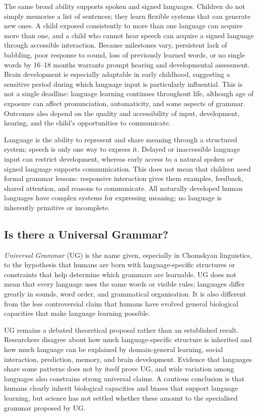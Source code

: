 \documentclass[11pt,oneside]{report}
\begin{document}
The same broad ability supports spoken and signed languages. Children do not
simply memorise a list of sentences; they learn flexible systems that can
generate new ones. A child exposed consistently to more than one language can
acquire more than one, and a child who cannot hear speech can acquire a signed
language through accessible interaction. Because milestones vary, persistent
lack of babbling, poor response to sound, loss of previously learned words, or
no single words by 16--18 months warrants prompt hearing and developmental
assessment. Brain development is especially
adaptable in early childhood, suggesting a sensitive period during which
language input is particularly influential. This is not a single deadline:
language learning continues throughout life, although age of exposure can
affect pronunciation, automaticity, and some aspects of grammar. Outcomes also
depend on the quality and accessibility of input, development, hearing, and the
child's opportunities to communicate.

Language is the ability to represent and share meaning through a structured
system; speech is only one way to express it. Delayed or inaccessible language
input can restrict development, whereas early access to a natural spoken or
signed language supports communication. This does not mean that children need
formal grammar lessons: responsive interaction gives them examples, feedback,
shared attention, and reasons to communicate. All naturally developed human
languages have complex systems for expressing meaning; no language is inherently
primitive or incomplete.

\subsection*{Is there a Universal Grammar?}

\emph{Universal Grammar} (UG) is the name given, especially in Chomskyan
linguistics, to the hypothesis that humans are born with language-specific
structures or constraints that help determine which grammars are learnable. UG
does not mean that every language uses the same words or visible rules;
languages differ greatly in sounds, word order, and grammatical organisation.
It is also different from the less controversial claim that humans have evolved
general biological capacities that make language learning possible.

UG remains a debated theoretical proposal rather than an established result.
Researchers disagree about how much language-specific structure is inherited
and how much language can be explained by domain-general learning, social
interaction, prediction, memory, and brain development. Evidence that languages
share some patterns does not by itself prove UG, and wide variation among
languages also constrains strong universal claims. A cautious conclusion is
that humans clearly inherit biological capacities and biases that support
language learning, but science has not settled whether these amount to the
specialised grammar proposed by UG.
\end{document}
